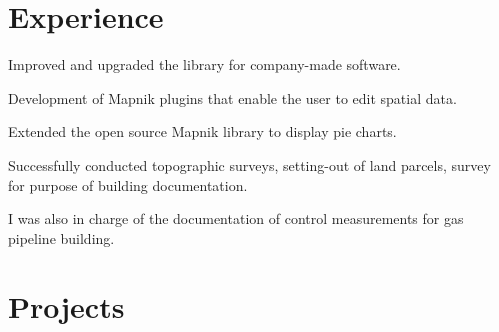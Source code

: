 \documentclass[letterpaper]{deedy-resume} %
\begin{document}
\hfill
%
%
\begin{minipage}[t]{0.66\textwidth} %


\section{Experience}


\vspace{\topsep} %
\begin{tightitemize}
\item Improved and upgraded the library for company-made software. 
\item Development of Mapnik plugins that enable the user to edit spatial data. 
\item Extended the open source Mapnik library to display pie charts.
\end{tightitemize}

\sectionspace %



\begin{tightitemize}
\item Successfully conducted topographic surveys, setting-out of land parcels, survey for purpose of building documentation.
\item I was also in charge of the documentation of control measurements for gas pipeline building. 
\end{tightitemize}

\sectionspace %


\section{Projects}


\end{minipage}
\end{document}
